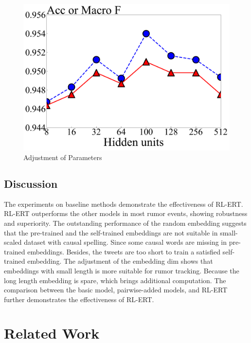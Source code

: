 \documentclass[review]{elsarticle}
\begin{document}
\begin{figure}[tbp]
{\begin{minipage}[b]{0.35\linewidth}
			\includegraphics[width=1\linewidth]{hidden_units}
		\end{minipage}
	}
	\caption{Adjustment of Parameters}
	\label{fig:parameter}
\end{figure}

\subsection{Discussion}
The experiments on baseline methods demonstrate the effectiveness of RL-ERT. RL-ERT outperforms the other models in most rumor events, showing robustness and superiority. The outstanding performance of the random embedding suggests that the pre-trained and the self-trained embeddings are not suitable in small-scaled dataset with causal spelling. Since some causal words are missing in pre-trained embeddings. Besides, the tweets are too short to train a satisfied self-trained embedding. The adjustment of the embedding dim shows that embeddings with small length is more suitable for rumor tracking. Because the long length embedding is spare, which brings additional computation. The comparison between the basic model, pairwise-added models, and RL-ERT further demonstrates the effectiveness of RL-ERT. 


\section{Related Work}
\label{sec:related}
\end{document}
